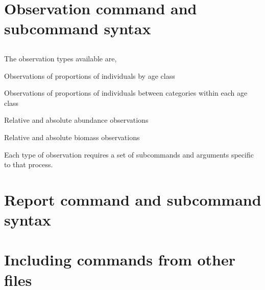 \section{Observation command and subcommand syntax\label{sec:observation-syntax}}


\subsection{}

The observation types available are,

\begin{description}
  \item Observations of proportions of individuals by age class
  \item Observations of proportions of individuals between categories within each age class
  \item Relative and absolute abundance observations
  \item Relative and absolute biomass observations
\end{description}

Each type of observation requires a set of subcommands and arguments specific to that process.



\subsection{}


\section{Report command and subcommand syntax\label{sec:report-syntax}}
\subsection{}



\section{Including commands from other files\label{sec:general-syntax}}


